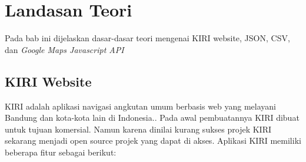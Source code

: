 
\chapter{Landasan Teori}
\label{chap:teori}
Pada bab ini dijelaskan dasar-dasar teori mengenai KIRI website, JSON, CSV, dan \textit{Google Maps Javascript API}

\section{KIRI Website }
\label{sec:KIRI} 
KIRI adalah aplikasi navigasi angkutan umum berbasis web yang melayani Bandung dan kota-kota lain di Indonesia.\cite{pascal:17:KIRI}.
Pada awal pembuatannya KIRI dibuat untuk tujuan komersial. Namun karena dinilai kurang sukses projek KIRI sekarang menjadi open source projek yang dapat di akses. Aplikasi KIRI memiliki beberapa fitur sebagai berikut:
